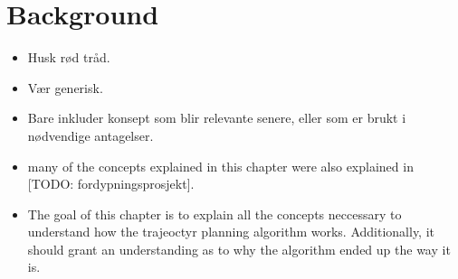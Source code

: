 \section{Background}
\begin{itemize}
    \item Husk rød tråd.
    \item Vær generisk.
    \item Bare inkluder konsept som blir relevante senere, eller som er brukt i nødvendige antagelser.
    \item many of the concepts explained in this chapter were also explained in [TODO: fordypningsprosjekt].
    \item The goal of this chapter is to explain all the concepts neccessary to understand how the trajeoctyr planning algorithm works.
    Additionally, it should grant an understanding as to why the algorithm ended up the way it is.
\end{itemize}

